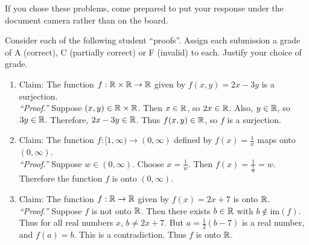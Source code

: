 \documentclass[12pt]{article}
\begin{document}
\newpage
If you chose these problems, come prepared to put your response under the document camera rather than on the board.
\begin{qu}
Consider each of the following student ``proofs''. Assign each submission a grade of A (correct), C (partially correct) or F (invalid) to each. Justify your choice of grade.
\begin{enumerate}[label=\alph*)]
\item Claim: The function $f:\mathbb R \times \mathbb R \to \mathbb R$ given by $f(x,y)=2x-3y$ is a surjection. \\
\emph{``Proof.''} Suppose $(x,y) \in \mathbb R \times \mathbb R$. Then $x \in \mathbb R$, so $2x \in \mathbb R$. Also, $y \in \mathbb R$, so $3y \in \mathbb R$. Therefore, $2x-3y \in \mathbb R$. Thus $f(x,y) \in \mathbb R$, so $f$ is a surjection.
\item Claim: The function $f: [1,\infty) \to (0, \infty)$ defined by $f(x)=\frac{1}{x}$ maps onto $(0, \infty)$. \\
\emph{``Proof.''} Suppose $w \in (0, \infty)$. Choose $x =\frac{1}{w}$. Then $f(x)=\frac{1}{\frac{1}{w}}=w$. Therefore the function $f$ is onto $(0, \infty)$.
\item Claim: The function $f: \mathbb R \to \mathbb R$ given by $f(x)=2x+7$ is onto $\mathbb R$. \\
\emph{``Proof.''} Suppose $f$ is not onto $\mathbb R$. Then there exists $b \in \mathbb R$ with $b \notin \textrm{im}( f)$. Thus for all real numbers $x$, $b \ne 2x+7$. But $a= \frac{1}{2}(b-7)$ is a real number, and $f(a)=b$. This is a contradiction. Thus $f$ is onto $\mathbb R$.
\end{enumerate}
\end{qu}
\end{document}
